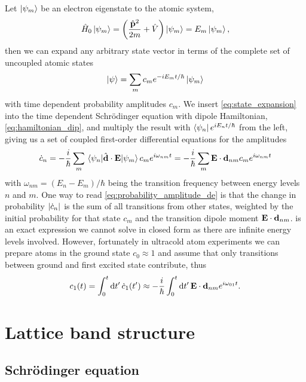Let $\ket{\psi_m}$ be an electron eigenstate to the atomic system,
\begin{equation}
  \hat{H}_0\ket{\psi_m}
  =\left(\frac{\hat{\vb{p}}^2}{2m}+\hat{V}\right)\ket{\psi_m}
  =E_m\ket{\psi_m},
\end{equation}
then we can expand any arbitrary state vector in terms of the complete set
of uncoupled atomic states
\begin{equation}
  \ket{\psi}=\sum_mc_me^{-iE_mt/\hbar}\ket{\psi_m}
  \label{eq:state_expansion}
\end{equation}
with time dependent probability amplitudes $c_m$. We insert
\cref{eq:state_expansion} into the time dependent Schrödinger equation with
dipole Hamiltonian, \cref{eq:hamiltonian_dip}, and multiply the result with
$\bra{\psi_n}e^{iE_nt/\hbar}$ from the left, giving us a set of coupled
first-order differential equations for the amplitudes
\begin{equation}
  \dot{c}_n
  =-\frac{i}{\hbar}\sum_m\mel{\psi_n}{\hat{\vb{d}}\cdot\vb{E}}{\psi_m}c_me^{i\omega_{nm}t}
  =-\frac{i}{\hbar}\sum_m\vb{E}\cdot\vb{d}_{nm}c_me^{i\omega_{nm}t}
  \label{eq:probability_amplitude_de}
\end{equation}
with $\omega_{nm}=(E_n-E_m)/\hbar$ being the transition frequency between
energy levels $n$ and $m$. One way to read \cref{eq:probability_amplitude_de}
is that the change in probability $\abs{\dot{c}_n}$ is the sum of all
transitions from other states, weighted by the initial probability for that
state $c_m$ and the transition dipole moment $\vb{E}\cdot\vb{d}_{nm}$.
 is an exact expression we cannot solve in
closed form as there are infinite energy levels involved. However, fortunately
in ultracold atom experiments we can prepare atoms in the ground state
$c_0\approx1$ and assume that only transitions between ground and first
excited state contribute, thus
\begin{equation}
  c_1(t)
  =\int^t_0\dd{t^\prime}\dot{c}_1(t^\prime)
  \approx-\frac{i}{\hbar}\int^t_0\dd{t^\prime}\vb{E}\cdot\vb{d}_{nm}e^{i\omega_{01}t}.
\end{equation}

\section{Lattice band structure}

\subsection{Schrödinger equation}

